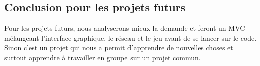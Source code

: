 \documentclass[french]{article}
\begin{document}
\subsection{Conclusion pour les projets futurs}
Pour les projets futurs, nous analyserons mieux la demande et feront un MVC mélangeant l'interface graphique, le réseau et le jeu avant de se lancer sur le code. Sinon c'est un projet qui nous a permit d'apprendre de nouvelles choses et surtout apprendre à travailler en groupe sur un projet commun.
\end{document}
